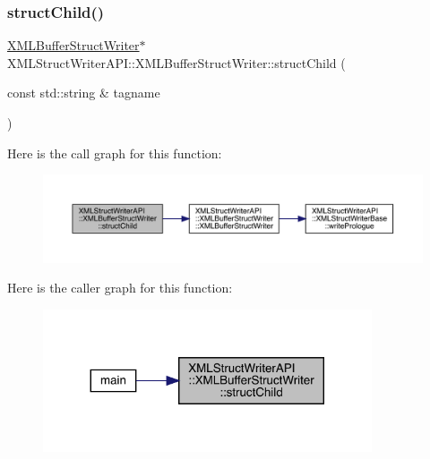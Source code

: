 \subsubsection{\texorpdfstring{structChild()}{structChild()}\hspace{0.1cm}{\footnotesize\ttfamily [1/2]}}
{\footnotesize\ttfamily \mbox{\hyperlink{classXMLStructWriterAPI_1_1XMLBufferStructWriter}{X\+M\+L\+Buffer\+Struct\+Writer}}$\ast$ X\+M\+L\+Struct\+Writer\+A\+P\+I\+::\+X\+M\+L\+Buffer\+Struct\+Writer\+::struct\+Child (\begin{DoxyParamCaption}\item[{const std\+::string \&}]{tagname }\end{DoxyParamCaption})\hspace{0.3cm}{\ttfamily [inline]}}

Here is the call graph for this function\+:
\nopagebreak
\begin{figure}[H]
\begin{center}
\leavevmode
\includegraphics[width=350pt]{d2/d0a/classXMLStructWriterAPI_1_1XMLBufferStructWriter_a1c5689221a56527dfd86ac071db3a534_cgraph}
\end{center}
\end{figure}
Here is the caller graph for this function\+:\nopagebreak
\begin{figure}[H]
\begin{center}
\leavevmode
\includegraphics[width=275pt]{d2/d0a/classXMLStructWriterAPI_1_1XMLBufferStructWriter_a1c5689221a56527dfd86ac071db3a534_icgraph}
\end{center}
\end{figure}
\mbox{\label{classXMLStructWriterAPI_1_1XMLBufferStructWriter_a1c5689221a56527dfd86ac071db3a534}} 
